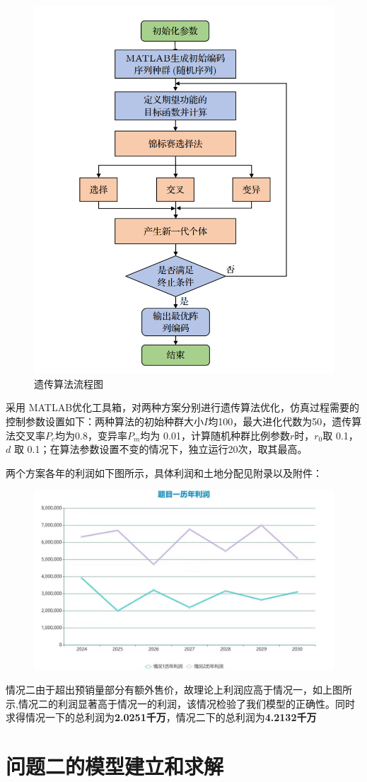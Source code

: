 \documentclass[withoutpreface,bwprint]{cumcmthesis} %
\begin{document}
\begin{figure}[H]
	\caption{遗传算法流程图}
	\centering
	\includegraphics[width=0.5\linewidth]{figures/图片1}
\end{figure}

采用 MATLAB优化工具箱，对两种方案分别进行遗传算法优化，仿真过程需要的控制参数设置如下：两种算法的初始种群大小$I$均100，最大进化代数为50，遗传算法交叉率$P_c$均为0.8，变异率$P_m$均为  0.01，计算随机种群比例参数$r$时，$r_0 $取 0.1，$d$ 取 0.1；在算法参数设置不变的情况下，独立运行20次，取其最高。

两个方案各年的利润如下图所示，具体利润和土地分配见附录以及附件：

\begin{figure}[H]
	\centering
	\includegraphics[width=0.8\linewidth]{figures/wentiyi}
\end{figure}


情况二由于超出预销量部分有额外售价，故理论上利润应高于情况一，如上图所示,情况二的利润显著高于情况一的利润，该情况检验了我们模型的正确性。同时求得情况一下的总利润为\textbf{2.0251千万}，情况二下的总利润为\textbf{4.2132千万}
\section{问题二的模型建立和求解}
\end{document}
